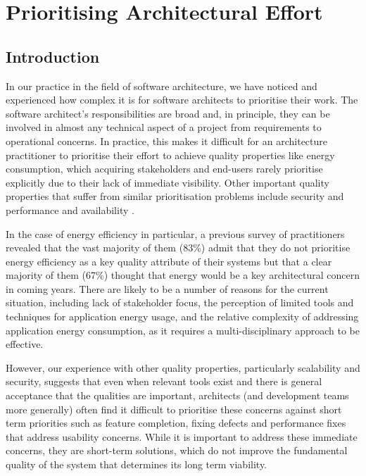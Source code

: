 \chapter{Prioritising Architectural Effort}
\label{chapter:prioritisation}

\section{Introduction}

In our practice in the field of software architecture, we have noticed and experienced how complex it is for software architects to prioritise their work.  The software architect's responsibilities are broad and, in principle, they can be involved in almost any technical aspect of a project from requirements to operational concerns.  In practice, this makes it difficult for an architecture practitioner to prioritise their effort to achieve quality properties like energy consumption, which acquiring stakeholders and end-users rarely prioritise explicitly due to their lack of immediate visibility.  Other important quality properties that suffer from similar prioritisation problems include security \cite{cisco2016-uksecprioritisation} and performance and availability \cite{ozkaya2008-qualityproperties}.

In the case of energy efficiency in particular, a previous survey of practitioners \cite{bashroush2016-datacentreenergy} revealed that the vast majority of them (83\%) admit that they do not prioritise energy efficiency as a key quality attribute of their systems but that a clear majority of them (67\%) thought that energy would be a key architectural concern in coming years.  There are likely to be a number of reasons for the current situation, including lack of stakeholder focus, the perception of limited tools and techniques for application energy usage, and the relative complexity of addressing application energy consumption, as it requires a multi-disciplinary approach to be effective.

However, our experience with other quality properties, particularly scalability and security, suggests that even when relevant tools exist and there is general acceptance that the qualities are important, architects (and development teams more generally) often find it difficult to prioritise these concerns against short term priorities such as feature completion, fixing defects and performance fixes that address usability concerns.  While it is important to address these immediate concerns, they are short-term solutions, which do not improve the fundamental quality of the system that determines its long term viability. 

